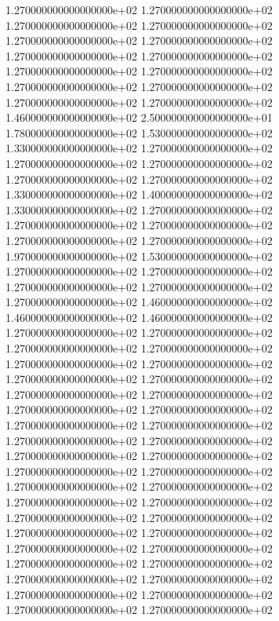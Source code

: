 1.270000000000000000e+02 1.270000000000000000e+02 1.270000000000000000e+02 1.270000000000000000e+02 1.270000000000000000e+02 1.270000000000000000e+02 1.270000000000000000e+02 1.270000000000000000e+02 1.270000000000000000e+02 1.270000000000000000e+02 1.270000000000000000e+02 1.270000000000000000e+02 1.270000000000000000e+02 1.270000000000000000e+02 1.460000000000000000e+02 2.500000000000000000e+01 1.780000000000000000e+02 1.530000000000000000e+02 1.330000000000000000e+02 1.270000000000000000e+02 1.270000000000000000e+02 1.270000000000000000e+02 1.270000000000000000e+02 1.270000000000000000e+02 1.330000000000000000e+02 1.400000000000000000e+02 1.330000000000000000e+02 1.270000000000000000e+02 1.270000000000000000e+02 1.270000000000000000e+02 1.270000000000000000e+02 1.270000000000000000e+02 1.970000000000000000e+02 1.530000000000000000e+02 1.270000000000000000e+02 1.270000000000000000e+02 1.270000000000000000e+02 1.270000000000000000e+02 1.270000000000000000e+02 1.460000000000000000e+02 1.460000000000000000e+02 1.460000000000000000e+02 1.270000000000000000e+02 1.270000000000000000e+02 1.270000000000000000e+02 1.270000000000000000e+02 1.270000000000000000e+02 1.270000000000000000e+02 1.270000000000000000e+02 1.270000000000000000e+02 1.270000000000000000e+02 1.270000000000000000e+02 1.270000000000000000e+02 1.270000000000000000e+02 1.270000000000000000e+02 1.270000000000000000e+02 1.270000000000000000e+02 1.270000000000000000e+02 1.270000000000000000e+02 1.270000000000000000e+02 1.270000000000000000e+02 1.270000000000000000e+02 1.270000000000000000e+02 1.270000000000000000e+02 1.270000000000000000e+02 1.270000000000000000e+02 1.270000000000000000e+02 1.270000000000000000e+02 1.270000000000000000e+02 1.270000000000000000e+02 1.270000000000000000e+02 1.270000000000000000e+02 1.270000000000000000e+02 1.270000000000000000e+02 1.270000000000000000e+02 1.270000000000000000e+02 1.270000000000000000e+02 1.270000000000000000e+02 1.270000000000000000e+02 1.270000000000000000e+02
